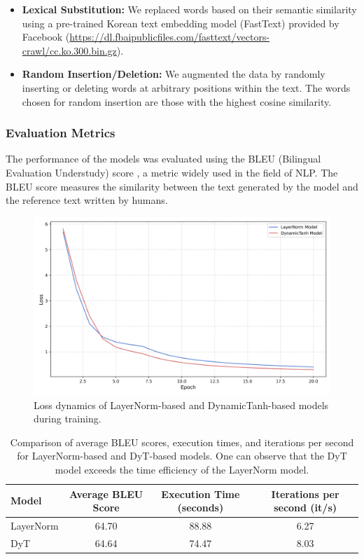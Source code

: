 \documentclass{article}
\begin{document}
\begin{itemize}
    \item \textbf{Lexical Substitution:} We replaced words based on their semantic similarity using a pre-trained Korean text embedding model (FastText) provided by Facebook (\url{https://dl.fbaipublicfiles.com/fasttext/vectors-crawl/cc.ko.300.bin.gz}).
    \item \textbf{Random Insertion/Deletion:} We augmented the data by randomly inserting or deleting words at arbitrary positions within the text. The words chosen for random insertion are those with the highest cosine similarity. 
\end{itemize}

\subsubsection{Evaluation Metrics}
The performance of the models was evaluated using the BLEU (Bilingual Evaluation Understudy) score \cite{papineni2002bleu}, a metric widely used in the field of NLP. The BLEU score measures the similarity between the text generated by the model and the reference text written by humans.

\begin{figure}[h!]
    \centering
    \includegraphics[width=1\textwidth]{figure_loss_dynamics.png}
    \caption{Loss dynamics of LayerNorm-based and DynamicTanh-based models during training.}
    \label{fig:loss_dynamics}
\end{figure}

\begin{center}
\begin{table}
\caption{Comparison of average BLEU scores, execution times, and iterations per second for LayerNorm-based and DyT-based models. One can observe that the DyT model exceeds the time efficiency of the LayerNorm model.}
\label{tab:experimental_results}
\begin{tabular}{lccc}
\toprule
Model & Average BLEU Score & Execution Time (seconds) & Iterations per second (it/s) \\
\midrule
LayerNorm & 64.70 & 88.88 & 6.27 \\
DyT & 64.64 & 74.47 & 8.03 \\
\bottomrule
\end{tabular}
\end{table}
\end{center}
\end{document}
